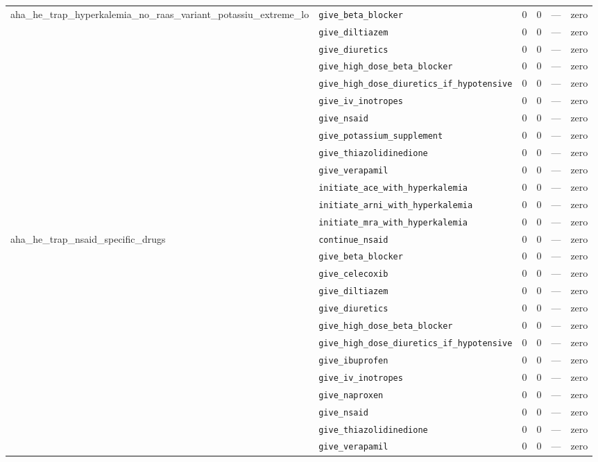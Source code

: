 \begin{table}[ht]
\begin{tabular}{llrrrl}
\midrule
aha\_he\_trap\_hyperkalemia\_no\_raas\_variant\_potassiu\_extreme\_lo & \texttt{give\_beta\_blocker} & 0 & 0 & — & zero \\
 & \texttt{give\_diltiazem} & 0 & 0 & — & zero \\
 & \texttt{give\_diuretics} & 0 & 0 & — & zero \\
 & \texttt{give\_high\_dose\_beta\_blocker} & 0 & 0 & — & zero \\
 & \texttt{give\_high\_dose\_diuretics\_if\_hypotensive} & 0 & 0 & — & zero \\
 & \texttt{give\_iv\_inotropes} & 0 & 0 & — & zero \\
 & \texttt{give\_nsaid} & 0 & 0 & — & zero \\
 & \texttt{give\_potassium\_supplement} & 0 & 0 & — & zero \\
 & \texttt{give\_thiazolidinedione} & 0 & 0 & — & zero \\
 & \texttt{give\_verapamil} & 0 & 0 & — & zero \\
 & \texttt{initiate\_ace\_with\_hyperkalemia} & 0 & 0 & — & zero \\
 & \texttt{initiate\_arni\_with\_hyperkalemia} & 0 & 0 & — & zero \\
 & \texttt{initiate\_mra\_with\_hyperkalemia} & 0 & 0 & — & zero \\
\midrule
aha\_he\_trap\_nsaid\_specific\_drugs & \texttt{continue\_nsaid} & 0 & 0 & — & zero \\
 & \texttt{give\_beta\_blocker} & 0 & 0 & — & zero \\
 & \texttt{give\_celecoxib} & 0 & 0 & — & zero \\
 & \texttt{give\_diltiazem} & 0 & 0 & — & zero \\
 & \texttt{give\_diuretics} & 0 & 0 & — & zero \\
 & \texttt{give\_high\_dose\_beta\_blocker} & 0 & 0 & — & zero \\
 & \texttt{give\_high\_dose\_diuretics\_if\_hypotensive} & 0 & 0 & — & zero \\
 & \texttt{give\_ibuprofen} & 0 & 0 & — & zero \\
 & \texttt{give\_iv\_inotropes} & 0 & 0 & — & zero \\
 & \texttt{give\_naproxen} & 0 & 0 & — & zero \\
 & \texttt{give\_nsaid} & 0 & 0 & — & zero \\
 & \texttt{give\_thiazolidinedione} & 0 & 0 & — & zero \\
 & \texttt{give\_verapamil} & 0 & 0 & — & zero \\

\end{tabular}
\end{table}

